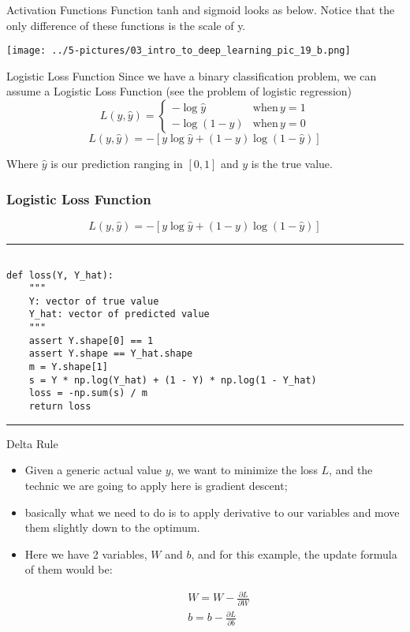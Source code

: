 \documentclass[11pt]{beamer}
\newcommand{\highlight}[1]{%
  \colorbox{yellow!100}{$\displaystyle#1$}}
\begin{document}
\begin{frame}{Activation Functions}
Function tanh and sigmoid looks as below. Notice that the only difference of these functions is the scale of y.
	\begin{center}
	\texttt{[image: ../5-pictures/03\_intro\_to\_deep\_learning\_pic\_19\_b.png]}
	\end{center}
\end{frame}
\begin{frame}{Logistic Loss Function}
Since we have a binary classification problem, we can assume a Logistic Loss Function (see the problem of logistic regression)
\begin{equation}
L(y, \hat{y}) = 
\begin{cases} 
-\log{\hat{y}} & \text{when}\, y = 1 \\ -\log(1 - \hat{y}) & \text{when}\, y = 0 
\end{cases} 
\end{equation}
$$ L(y, \hat{y}) = -[y\log{\hat{y}} + (1 - y)\log{(1 - \hat{y})}] $$

Where $\hat y$ is our \highlight{\text{prediction}} ranging in $[0, 1]$ and $y$ is the \highlight{\text{true}} value. 

\end{frame}
\begin{frame}[fragile]
\frametitle{Logistic Loss Function}

$$ L(y, \hat{y}) = -[y\log{\hat{y}} + (1 - y)\log{(1 - \hat{y})}] $$

\rule{\textwidth}{1pt}
\scriptsize
\begin{verbatim}

def loss(Y, Y_hat):
    """
    Y: vector of true value
    Y_hat: vector of predicted value
    """
    assert Y.shape[0] == 1
    assert Y.shape == Y_hat.shape
    m = Y.shape[1]
    s = Y * np.log(Y_hat) + (1 - Y) * np.log(1 - Y_hat)
    loss = -np.sum(s) / m
    return loss

\end{verbatim}
\rule{\textwidth}{1pt}
\end{frame}
\begin{frame}{Delta Rule}
\begin{itemize}
\item Given a generic actual value $y$, we want to minimize the loss $L$, and the technic we are going to apply here is gradient descent; 
\item basically what we need to do is to apply derivative to our variables and move them slightly down to the optimum. 
\item Here we have 2 variables, $W$ and $b$, and for this example, the update formula of them would be:

\begin{align*}
&W = W - \frac{\partial L}{\partial W} \\
&b = b - \frac{\partial L}{\partial b}
\end{align*}

\end{itemize}
\end{frame}
\end{document}
